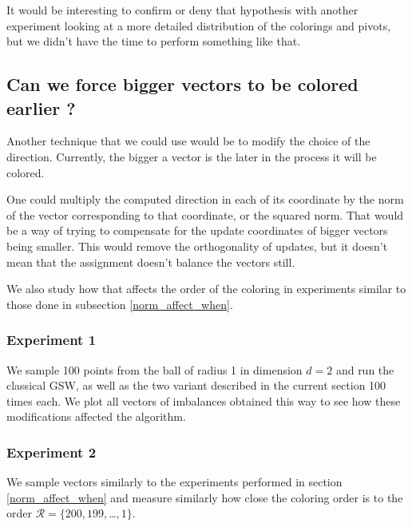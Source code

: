 \documentclass[12pt]{article}
\begin{document}
It would be interesting to confirm or deny that hypothesis with another experiment looking at a more detailed distribution of the colorings and pivots, but we didn't have the time to perform something like that.

\subsection{Can we force bigger vectors to be colored earlier ?}\label{bigger_earlier}
Another technique that we could use would be to modify the choice of the direction. Currently, the bigger a vector is the later in the process it will be colored. 

One could multiply the computed direction in each of its coordinate by the norm of the vector corresponding to that coordinate, or the squared norm. That would be a way of trying to compensate for the update coordinates of bigger vectors being smaller. This would remove the orthogonality of updates, but it doesn't mean that the assignment doesn't balance the vectors still.

We also study how that affects the order of the coloring in experiments similar to those done in subsection \ref{norm_affect_when}.
\subsubsection{Experiment 1}\label{bigger_earlier_exp1}
We sample 100 points from the ball of radius 1 in dimension $d=2$ and run the classical GSW, as well as the two variant described in the current section 100 times each. We plot all vectors of imbalances obtained this way to see how these modifications affected the algorithm.
\subsubsection{Experiment 2}\label{bigger_earlier_exp2}
We sample vectors similarly to the experiments performed in section \ref{norm_affect_when} and measure similarly how close the coloring order is to the order $\mathcal{R}=\{200,199,$\dots$,1\}$.
\end{document}
